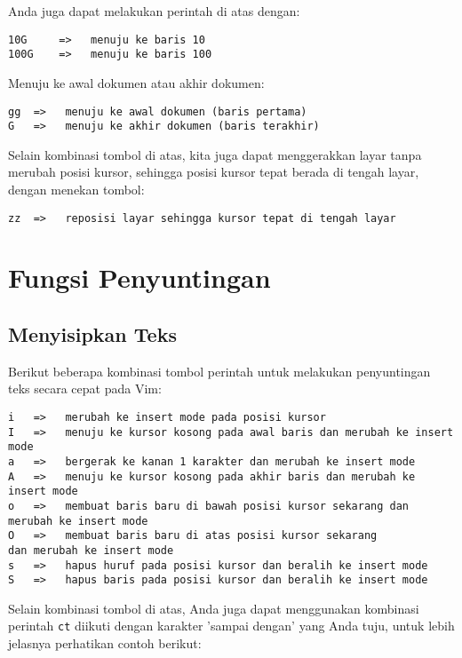 \documentclass{article}
\begin{document}
Anda juga dapat melakukan perintah di atas dengan:

\begin{verbatim}
10G     =>   menuju ke baris 10
100G    =>   menuju ke baris 100
\end{verbatim}

Menuju ke awal dokumen atau akhir dokumen:

\begin{verbatim}
gg  =>   menuju ke awal dokumen (baris pertama)
G   =>   menuju ke akhir dokumen (baris terakhir)
\end{verbatim}

Selain kombinasi tombol di atas, kita juga dapat
menggerakkan layar tanpa merubah posisi kursor, sehingga
posisi kursor tepat berada di tengah layar, dengan menekan
tombol:

\begin{verbatim}
zz  =>   reposisi layar sehingga kursor tepat di tengah layar
\end{verbatim}

\section{Fungsi Penyuntingan}

\subsection{Menyisipkan Teks}
Berikut beberapa kombinasi tombol perintah untuk melakukan
penyuntingan teks secara cepat pada Vim:

\begin{verbatim}
i   =>   merubah ke insert mode pada posisi kursor
I   =>   menuju ke kursor kosong pada awal baris dan merubah ke insert mode
a   =>   bergerak ke kanan 1 karakter dan merubah ke insert mode
A   =>   menuju ke kursor kosong pada akhir baris dan merubah ke insert mode
o   =>   membuat baris baru di bawah posisi kursor sekarang dan merubah ke insert mode
O   =>   membuat baris baru di atas posisi kursor sekarang
dan merubah ke insert mode
s   =>   hapus huruf pada posisi kursor dan beralih ke insert mode
S   =>   hapus baris pada posisi kursor dan beralih ke insert mode
\end{verbatim}

Selain kombinasi tombol di atas, Anda juga dapat menggunakan
kombinasi perintah \verb=ct= diikuti dengan karakter 'sampai
dengan' yang Anda tuju, untuk lebih jelasnya perhatikan
contoh berikut:
\end{document}
